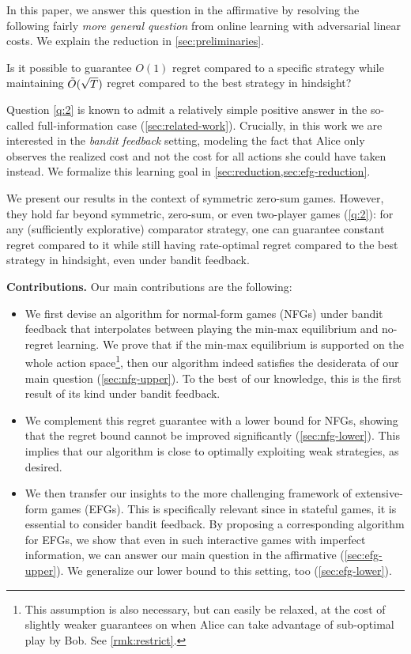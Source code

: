 \documentclass[11pt]{article}
\begin{document}
In this paper, we answer this question in the affirmative by resolving the following fairly \emph{more general question} from online learning with adversarial linear costs. We explain the reduction in \cref{sec:preliminaries}.
\begin{question}\label{q:2}
    Is it possible to guarantee $O(1)$ regret compared to a specific strategy while maintaining $\tilde{O}(\sqrt{T})$ regret compared to the best strategy in hindsight?
\end{question}
Question \ref{q:2} is known to admit a relatively simple positive answer in the so-called full-information case (\cref{sec:related-work}). Crucially, in this work we are interested in the \emph{bandit feedback} setting, modeling the fact that Alice only observes the realized cost and not the cost for all actions she could have taken instead. We formalize this learning goal in \cref{sec:reduction,sec:efg-reduction}.

We present our results in the context of symmetric zero-sum games. However, they hold far beyond symmetric, zero-sum, or even two-player games (\cref{q:2}): for any (sufficiently explorative) comparator strategy, one can guarantee constant regret compared to it while still having rate-optimal regret compared to the best strategy in hindsight, even under bandit feedback.

\textbf{Contributions.} Our main contributions are the following:
\begin{itemize}[leftmargin=*] 
    \item We first devise an algorithm for normal-form games (NFGs) under bandit feedback that interpolates between playing the min-max equilibrium and no-regret learning. We prove that if the min-max equilibrium is supported on the whole action space\footnote{This assumption is also necessary, but can easily be relaxed, at the cost of slightly weaker guarantees on when Alice can take advantage of sub-optimal play by Bob. See \cref{rmk:restrict}.}, then our algorithm indeed satisfies the desiderata of our main question (\cref{sec:nfg-upper}). To the best of our knowledge, this is the first result of its kind under bandit feedback.
    \item We complement this regret guarantee with a lower bound for NFGs, showing that the regret bound cannot be improved significantly (\cref{sec:nfg-lower}). This implies that our algorithm is close to optimally exploiting weak strategies, as desired.
    \item We then transfer our insights to the more challenging framework of extensive-form games (EFGs). This is specifically relevant since in stateful games, it is essential to consider bandit feedback. By proposing a corresponding algorithm for EFGs, we show that even in such interactive games with imperfect information, we can answer our main question in the affirmative (\cref{sec:efg-upper}). We generalize our lower bound to this setting, too (\cref{sec:efg-lower}). 
\end{itemize}
\end{document}
